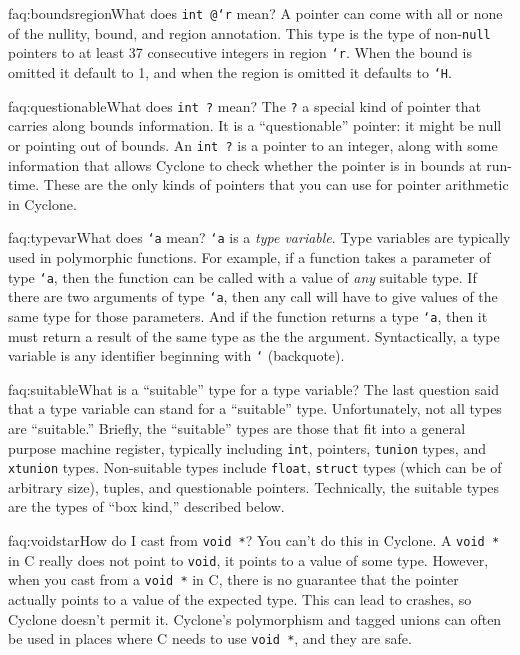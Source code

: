 \begin{faqa}{faq:boundsregion}{What does \texttt{int @\rb `r} mean?}
A pointer can come with all or none of the nullity, bound, and region
annotation.  This type is the type of non-\texttt{null} pointers to
at least 37 consecutive integers in region \texttt{`r}.  When the
bound is omitted it default to 1, and when the region is omitted
it defaults to \texttt{`H}.
\end{faqa}

\begin{faqa}{faq:questionable}{What does \texttt{int ?} mean?}
The \texttt{?} a special kind of pointer that carries along bounds
information.  It is a ``questionable'' pointer: it might be null or
pointing out of bounds.  An \texttt{int ?} is a pointer to an integer,
along with some information that allows Cyclone to check whether the
pointer is in bounds at run-time.  These are the only kinds of
pointers that you can use for pointer arithmetic in Cyclone.
\end{faqa}

\begin{faqa}{faq:typevar}{What does \texttt{`a} mean?}
\texttt{`a} is a \emph{type variable}.  Type variables are typically
used in polymorphic functions.  For example, if a function takes a
parameter of type \texttt{`a}, then the function can be called with a
value of \emph{any} suitable type.  If there are two arguments of type
\texttt{`a}, then any call will have to give values of the same type
for those parameters.  And if the function returns a type \texttt{`a},
then it must return a result of the same type as the the argument.
Syntactically, a type variable is any identifier beginning with
\texttt{`} (backquote).
\end{faqa}

\begin{faqa}{faq:suitable}{What is a ``suitable'' type for a type variable?}
The last question said that a type variable can stand for a
``suitable'' type.  Unfortunately, not all types are ``suitable.''
Briefly, the ``suitable'' types are those that fit into a general
purpose machine register, typically including \texttt{int}, pointers,
\texttt{tunion} types, and \texttt{xtunion} types.  Non-suitable types
include \texttt{float}, \texttt{struct} types (which can be of
arbitrary size), tuples, and questionable pointers.
Technically, the suitable types are the types of ``box kind,''
described below.
\end{faqa}

\begin{faqa}{faq:voidstar}{How do I cast from \texttt{void *}?}
You can't do this in Cyclone.  A \texttt{void *} in C really does not
point to \texttt{void}, it points to a value of some type.  However,
when you cast from a \texttt{void *} in C, there is no guarantee that
the pointer actually points to a value of the expected type.  This can
lead to crashes, so Cyclone doesn't permit it.  Cyclone's
polymorphism and tagged unions can often be used in places where C
needs to use \texttt{void *}, and they are safe.
\end{faqa}

